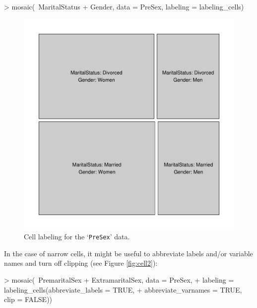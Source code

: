 \documentclass[a4paper]{article}
\newcommand{\data}[1]{`\texttt{#1}'}
\begin{document}
\begin{Schunk}
\begin{Sinput}
> mosaic(~MaritalStatus + Gender, data = PreSex, labeling = labeling_cells)
\end{Sinput}
\end{Schunk}

\begin{figure}[h]
\begin{center}
\includegraphics{labeling-cellfig}
\caption{Cell labeling for the \data{PreSex} data.}
\label{fig:cell}
\end{center}
\end{figure}

\noindent In the case of narrow cells, it might be useful to
abbreviate labels and/or variable names and turn off clipping (see Figure \ref{fig:cell2}):

\begin{Schunk}
\begin{Sinput}
> mosaic(~PremaritalSex + ExtramaritalSex, data = PreSex, 
+     labeling = labeling_cells(abbreviate_labels = TRUE, 
+         abbreviate_varnames = TRUE, clip = FALSE))
\end{Sinput}
\end{Schunk}
\end{document}
